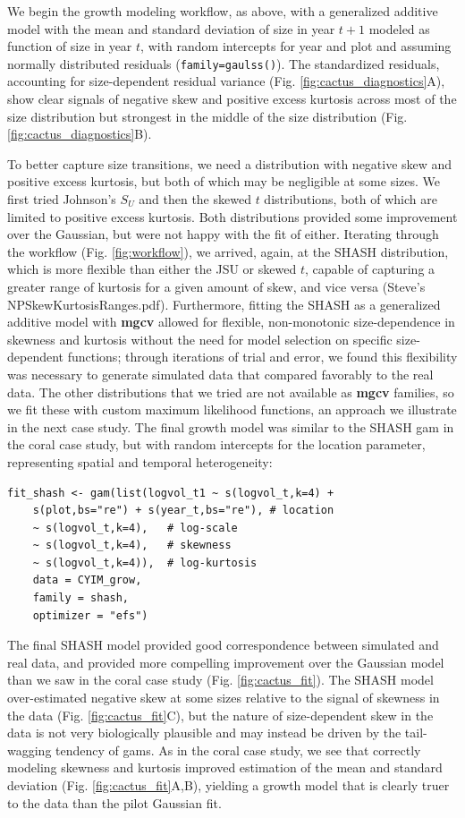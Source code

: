 \documentclass[12pt]{article}
\begin{document}
We begin the growth modeling workflow, as above, with a generalized additive model with the mean and standard deviation of size in year $t+1$ modeled as function of size in year $t$, with random intercepts for year and plot and assuming normally distributed residuals (\texttt{family=gaulss()}). 
The standardized residuals, accounting for size-dependent residual variance (Fig. \ref{fig:cactus_diagnostics}A), show clear signals of negative skew and positive excess kurtosis across most of the size distribution but strongest in the middle of the size distribution (Fig. \ref{fig:cactus_diagnostics}B). 

To better capture size transitions, we need a distribution with negative skew and positive excess kurtosis, but both of which may be negligible at some sizes.
We first tried Johnson's $S_{U}$ and then the skewed $t$ distributions, both of which are limited to positive excess kurtosis.
Both distributions provided some improvement over the Gaussian, but were not happy with the fit of either. 
Iterating through the workflow (Fig. \ref{fig:workflow}), we arrived, again, at the SHASH distribution, which is more flexible than either the JSU or skewed $t$, capable of capturing a greater range of kurtosis for a given amount of skew, and vice versa (Steve's NPSkewKurtosisRanges.pdf). 
Furthermore, fitting the SHASH as a generalized additive model with \textbf{mgcv} allowed for flexible, non-monotonic size-dependence in skewness and kurtosis without the need for model selection on specific size-dependent functions; through iterations of trial and error, we found this flexibility was necessary to generate simulated data that compared favorably to the real data. 
The other distributions that we tried are not available as \textbf{mgcv} families, so we fit these with custom maximum likelihood functions, an approach we illustrate in the next case study.
The final growth model was similar to the SHASH gam in the coral case study, but with random intercepts for the location parameter, representing spatial and temporal heterogeneity:
\begin{lstlisting}
fit_shash <- gam(list(logvol_t1 ~ s(logvol_t,k=4) + 
    s(plot,bs="re") + s(year_t,bs="re"), # location 
    ~ s(logvol_t,k=4),   # log-scale
    ~ s(logvol_t,k=4),   # skewness
    ~ s(logvol_t,k=4)),  # log-kurtosis
    data = CYIM_grow, 
    family = shash,  
    optimizer = "efs")
\end{lstlisting}

The final SHASH model provided good correspondence between simulated and real data, and provided more compelling improvement over the Gaussian model than we saw in the coral case study (Fig. \ref{fig:cactus_fit}). 
The SHASH model over-estimated negative skew at some sizes relative to the signal of skewness in the data (Fig. \ref{fig:cactus_fit}C), but the nature of size-dependent skew in the data is not very biologically plausible and may instead be driven by the tail-wagging tendency of gams. 
As in the coral case study, we see that correctly modeling skewness and kurtosis improved estimation of the mean and standard deviation (Fig. \ref{fig:cactus_fit}A,B), yielding a growth model that is clearly truer to the data than the pilot Gaussian fit. 
\end{document}
